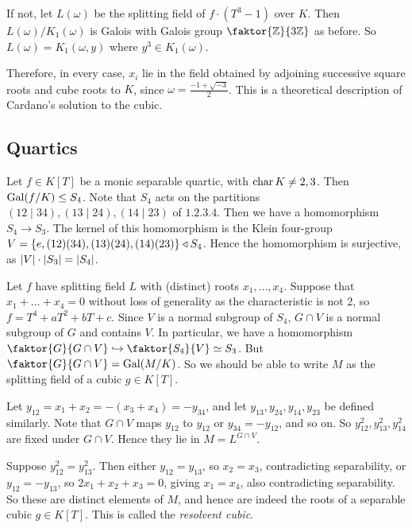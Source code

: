 If not, let \( L(\omega) \) be the splitting field of \( f \cdot (T^3 - 1) \) over \( K \).
Then \( L(\omega) / K_1(\omega) \) is Galois with Galois group \( \faktor{\mathbb Z}{3\mathbb Z} \) as before.
So \( L(\omega) = K_1(\omega, y) \) where \( y^3 \in K_1(\omega) \).

Therefore, in every case, \( x_i \) lie in the field obtained by adjoining successive square roots and cube roots to \( K \), since \( \omega = \frac{-1 + \sqrt{-3}}{2} \).
This is a theoretical description of Cardano's solution to the cubic.

\subsection{Quartics}
Let \( f \in K[T] \) be a monic separable quartic, with \( \operatorname{char} K \neq 2, 3 \).
Then \( \operatorname{Gal}(f/K) \leq S_4 \).
Note that \( S_4 \) acts on the partitions \( (12\mid 34), (13\mid 24), (14\mid 23) \) of \( \qty{1, 2, 3, 4} \).
Then we have a homomorphism \( S_4 \to S_3 \).
The kernel of this homomorphism is the Klein four-group \( V = \qty{e, (12)(34), (13)(24), (14)(23)} \triangleleft S_4 \).
Hence the homomorphism is surjective, as \( \abs{V} \cdot \abs{S_3} = \abs{S_4} \).

Let \( f \) have splitting field \( L \) with (distinct) roots \( x_1, \dots, x_4 \).
Suppose that \( x_1 + \dots + x_4 = 0 \) without loss of generality as the characteristic is not 2, so \( f = T^4 + aT^2 + bT + c \).
Since \( V \) is a normal subgroup of \( S_4 \), \( G \cap V \) is a normal subgroup of \( G \) and contains \( V \).
In particular, we have a homomorphism \( \faktor{G}{G \cap V} \hookrightarrow \faktor{S_4}{V} \simeq S_3 \).
But \( \faktor{G}{G \cap V} = \Gal(M/K) \).
So we should be able to write \( M \) as the splitting field of a cubic \( g \in K[T] \).

Let \( y_{12} = x_1 + x_2 = -(x_3 + x_4) = -y_{34} \), and let \( y_{13}, y_{24}, y_{14}, y_{23} \) be defined similarly.
Note that \( G \cap V \) maps \( y_{12} \) to \( y_{12} \) or \( y_{34} = -y_{12} \), and so on.
So \( y_{12}^2, y_{13}^2, y_{14}^2 \) are fixed under \( G \cap V \).
Hence they lie in \( M = L^{G \cap V} \).

Suppose \( y_{12}^2 = y_{13}^2 \).
Then either \( y_{12} = y_{13} \), so \( x_2 = x_3 \), contradicting separability, or \( y_{12} = -y_{13} \), so \( 2x_1 + x_2 + x_3 = 0 \), giving \( x_1 = x_4 \), also contradicting separability.
So these are distinct elements of \( M \), and hence are indeed the roots of a separable cubic \( g \in K[T] \).
This is called the \emph{resolvent cubic}.

